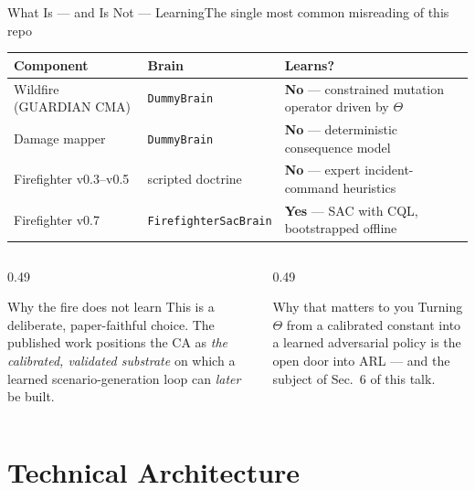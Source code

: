 \documentclass[aspectratio=169,9pt]{beamer}
\newcommand{\code}[1]{{\small\texttt{#1}}}
\begin{document}
\begin{frame}{What Is --- and Is Not --- Learning}{The single most common misreading of this repo}
  \centering
  \small
  \begin{tabular}{@{}l l l@{}}
    \toprule
    \textbf{Component} & \textbf{Brain} & \textbf{Learns?}\\
    \midrule
    Wildfire (GUARDIAN CMA) & \code{DummyBrain} & \textbf{No} --- constrained
      mutation operator driven by $\Theta$\\
    Damage mapper           & \code{DummyBrain} & \textbf{No} --- deterministic
      consequence model\\
    Firefighter v0.3--v0.5  & scripted doctrine & \textbf{No} --- expert
      incident-command heuristics\\
    Firefighter v0.7        & \code{FirefighterSacBrain} & \textbf{Yes} ---
      SAC with CQL, bootstrapped offline\\
    \bottomrule
  \end{tabular}
  \vskip10pt
  \begin{columns}[T,onlytextwidth]
    \begin{column}{0.49\textwidth}
      \begin{block}{Why the fire does not learn}
        \small This is a deliberate, paper-faithful choice. The published
        work positions the CA as \emph{the calibrated, validated substrate}
        on which a learned scenario-generation loop can \emph{later} be
        built.
      \end{block}
    \end{column}
    \begin{column}{0.49\textwidth}
      \begin{alertblock}{Why that matters to you}
        \small Turning $\Theta$ from a calibrated constant into a learned
        adversarial policy is the open door into ARL --- and the subject of
        Sec.~6 of this talk.
      \end{alertblock}
    \end{column}
  \end{columns}
\end{frame}

\section{Technical Architecture}
\end{document}
